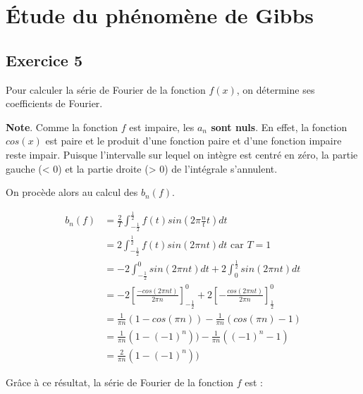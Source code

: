\documentclass[a4paper,11pt]{article}
\theoremstyle{nonumberplain}
\theoremstyle{nonumberplain}
\theoremstyle{nonumberplain}
\begin{document}
\section{\'{E}tude du phénomène de Gibbs}

\subsection*{Exercice 5}

    Pour calculer la série de Fourier de la fonction $f(x)$, on détermine ses coefficients de Fourier.

    \begin{mdframed}[backgroundcolor=gray!10]
        \textbf{Note}. Comme la fonction $f$ est impaire, les \textbf{$a_{n}$ sont nuls}.
        En effet, la fonction $cos(x)$ est paire et le produit d'une fonction paire et d'une fonction impaire reste impair. Puisque
        l'intervalle sur lequel on intègre est centré en zéro, la partie gauche (< 0) et la
        partie droite (> 0) de l'intégrale s'annulent.
    \end{mdframed}

    On procède alors au calcul des $b_{n}(f)$.

    \begin{equation*}
        \begin{split}
            b_{n}(f)    & = \frac{2}{T}\int_{-\frac{1}{2}}^{\frac{1}{2}} f(t)sin(2 \pi \frac{n}{t} t) dt \\
                        & = 2\int_{-\frac{1}{2}}^{\frac{1}{2}} f(t)sin(2 \pi n t) dt \text{ car } T = 1 \\
                        & = -2\int_{-\frac{1}{2}}^{0} sin(2 \pi n t) dt + 2\int_{0}^{\frac{1}{2}} sin(2 \pi n t) dt \\
                        & = -2\left[\frac{-cos(2 \pi n t)}{2 \pi n}\right]_{-\frac{1}{2}}^{0} + 2\left[-\frac{cos(2 \pi n t)}{2 \pi n}\right]_{\frac{1}{2}}^{0} \\
                        & = \frac{1}{\pi n}(1 - cos(\pi n)) - \frac{1}{\pi n}(cos(\pi n) - 1) \\
                        & = \frac{1}{\pi n}(1 - (-1)^n)) - \frac{1}{\pi n}((-1)^n - 1) \\
                        & = \frac{2}{\pi n}(1 - (-1)^n))
        \end{split}
    \end{equation*}

    Grâce à ce résultat, la série de Fourier de la fonction $f$ est :
\end{document}
